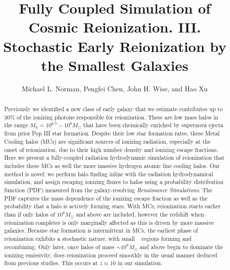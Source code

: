 \documentclass[iop,apj]{emulateapj}
\begin{document}

\title{Fully Coupled Simulation of Cosmic Reionization. III. Stochastic Early Reionization by the Smallest Galaxies}
\author{ 
  Michael L. Norman, 
  Pengfei Chen,
  John H. Wise,
  and Hao Xu
}

  



\begin{abstract}

Previously we identified a new class of early galaxy that we estimate contributes up to 30\% of the ionizing photons responsible for reionization. These are low mass halos in the range $M_h =10^{6.5}-10^{8} M_{\odot}$ that have been chemically enriched by supernova ejecta from prior Pop III star formation. Despite their low star formation rates, these Metal Cooling halos (MCs) are significant sources of ionizing radiation, especially at the onset of reionization, due to their high number density and ionizing escape fractions. Here we present a fully-coupled radiation hydrodynamic simulation of reionization that includes these MCs as well the more massive hydrogen atomic line cooling halos. Our method is novel: we perform halo finding inline with the radiation hydrodynamical simulation, and assign escaping ionizing fluxes to halos using a probability distribution function (PDF) measured from the galaxy-resolving {\it Renaissance Simulations}. The PDF captures the mass dependence of the ionizing escape fraction as well as the probability that a halo is actively forming stars.  With MCs, reionization starts earlier than if only halos of $10^8 M_{\odot}$ and above are included, however the redshift when reionization completes is only marginally affected as this is driven by more massive galaxies.  Because star formation is intermittent in MCs, the earliest phase of reionization exhibits a stochastic nature, with small \hii~ regions forming and recombining. Only later, once halos of mass $\sim 10^9 M_{\odot}$ and above begin to dominate the ionizing emissivity, does reionization proceed smoothly in the usual manner deduced from previous studies. This occurs at $z\approx 10$ in our simulation.  
\end{abstract}
\end{document}
